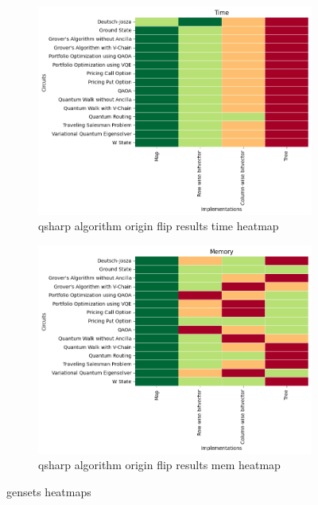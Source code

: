 
    \begin{figure}
    \centering
    \begin{subfigure}{.5\textwidth}
      \centering
      \includegraphics[width=1\linewidth]{benchmarks/./qsharp/gensets/algorithm/qsharp_algorithm_origin_flip_results_time_heatmap.png}
      \caption{qsharp algorithm origin flip results time heatmap}
      \label{fig:gensets_qsharp_algorithm_origin_flip_results_time_heatmap}
    \end{subfigure}
    \begin{subfigure}{.5\textwidth}
      \centering
      \includegraphics[width=1\linewidth]{benchmarks/./qsharp/gensets/algorithm/qsharp_algorithm_origin_flip_results_mem_heatmap.png}
      \caption{qsharp algorithm origin flip results mem heatmap}
      \label{fig:gensets_qsharp_algorithm_origin_flip_results_mem_heatmap}
    \end{subfigure}
    \caption{gensets heatmaps}
    \label{fig:gensets_qsharp_algorithm_origin_flip_results_heatmaps}
    \end{figure}
    